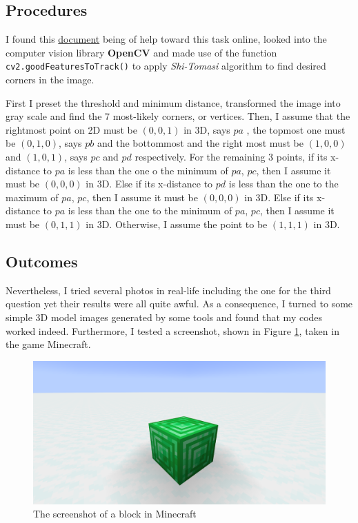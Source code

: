 \documentclass[12pt, a4paper]{article}
\begin{document}
\subsection{Procedures}

I found this
\href{https://docs.opencv.org/3.4/d4/d8c/tutorial_py_shi_tomasi.html}{document} being of help toward this task online, looked into the computer vision library \textbf{OpenCV} and made use of the function \texttt{cv2.goodFeaturesToTrack()} to apply \emph{Shi-Tomasi} algorithm to find desired corners in the image.

First I preset the threshold and minimum distance, transformed the image into gray scale and find the 7 most-likely corners, or vertices. Then, I assume that the rightmost point on 2D must be \((0,0,1)\) in 3D, says \(pa\) , the topmost one must be \((0,1,0)\), says \(pb\) and the bottommost and the right most must be \((1,0,0)\) and \((1,0,1)\), says \(pc\) and \(pd\) respectively. For the remaining 3 points, if its x-distance to \(pa\) is less than the one o the minimum of \(pa\), \(pc\), then I assume it must be \((0,0,0)\)
in 3D. Else if its x-distance to \(pd\) is less than the one to the maximum of \(pa\), \(pc\), then I assume it must be \((0,0,0)\) in 3D. Else if its x-distance to \(pa\) is less than the one to the minimum of \(pa\), \(pc\), then I assume it must be \((0,1,1)\) in 3D. Otherwise, I assume the point to be \((1,1,1)\) in 3D.

\subsection{Outcomes}

Nevertheless, I tried several photos in real-life including the one for the third question yet their results were all quite awful. As a consequence, I turned to some simple 3D model images generated by some tools and found that my codes worked indeed. Furthermore, I tested a screenshot, shown in Figure \ref{fig:block}, taken in the game Minecraft.

\begin{figure}[htbp]
\centering
\includegraphics[width=\linewidth]{A2_110062219.png}
\caption{The screenshot of a block in Minecraft}
\label{fig:block}
\end{figure}
\end{document}
